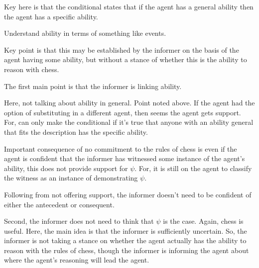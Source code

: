 \documentclass[10pt]{article}
\begin{document}
\begin{note}
  Key here is that the conditional states that if the agent has a general ability then the agent has a specific ability.

  Understand ability in terms of something like events.

  Key point is that this may be established by the informer on the basis of the agent having some ability, but without a stance of whether this is the ability to reason with chess.
\end{note}

\begin{note}
  The first main point is that the informer is linking ability.
\end{note}

\begin{note}
  Here, not talking about ability in general.
  Point noted above.
  If the agent had the option of substituting in a different agent, then seems the agent gets support.
  For, can only make the conditional if it's true that anyone with an ability general that fits the description has the specific ability.
\end{note}

\begin{note}
  Important consequence of no commitment to the rules of chess is even if the agent is confident that the informer has witnessed some instance of the agent's ability, this does not provide support for \(\psi\).
  For, it is still on the agent to classify the witness as an instance of demonstrating \(\psi\).
\end{note}

\begin{note}
  Following from not offering support, the informer doesn't need to be confident of either the antecedent or consequent.

  Second, the informer does not need to think that \(\psi\) is the case.
  Again, chess is useful.
  Here, the main idea is that the informer is sufficiently uncertain.
  So, the informer is not taking a stance on whether the agent actually has the ability to reason with the rules of chess, though the informer is informing the agent about where the agent's reasoning will lead the agent.
\end{note}
\end{document}
